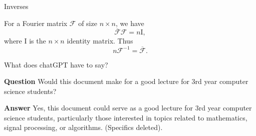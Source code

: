 \documentclass[portrait,fleqn,12pt]{beamer}
\begin{document}
  \begin{frame}{Inverses}
  
  For a Fourier matrix $\mathcal{F}$ of size $n\times n$, we have
  \begin{equation*} 
        \overline{\mathcal{F}} \mathcal{F} = n \mathrm{I},
  \end{equation*}
  where $\mathrm{I}$ is the $n \times n$ identity matrix.  Thus
      \begin{equation*} 
        n \mathcal{F}^{-1} = \overline{\mathcal{F}}.
  \end{equation*}
  
  
  \end{frame}
    
    \begin{frame}{What does chatGPT have to say?}
    
    \textbf{Question} Would this document make for a good lecture for 3rd year computer science students?
    
    \textbf{Answer} Yes, this document could serve as a good lecture for 3rd year computer science students, particularly those interested in topics related to mathematics, signal processing, or algorithms.  (Specifics deleted).
    
    \end{frame}
\end{document}
